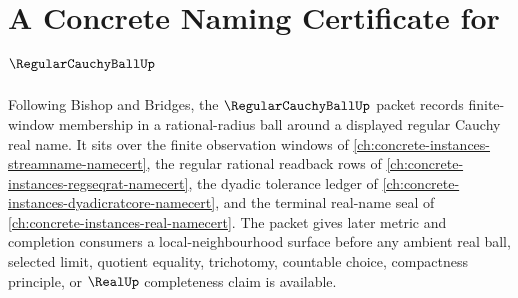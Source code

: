 \chapter{A Concrete Naming Certificate for $\RegularCauchyBallUp$}
\label{ch:concrete-instances-regular-cauchy-ball-namecert}

Following Bishop and Bridges, the $\RegularCauchyBallUp$ packet records finite-window membership in a rational-radius ball around a displayed regular Cauchy real name. It sits over the finite observation windows of \autoref{ch:concrete-instances-streamname-namecert}, the regular rational readback rows of \autoref{ch:concrete-instances-regseqrat-namecert}, the dyadic tolerance ledger of \autoref{ch:concrete-instances-dyadicratcore-namecert}, and the terminal real-name seal of \autoref{ch:concrete-instances-real-namecert}. The packet gives later metric and completion consumers a local-neighbourhood surface before any ambient real ball, selected limit, quotient equality, trichotomy, countable choice, compactness principle, or $\RealUp$ completeness claim is available.

